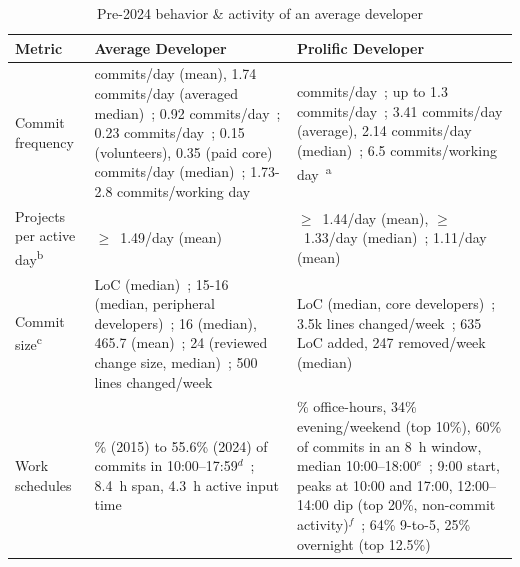 \documentclass[smallextended]{svjour3}
\begin{document}
\begin{table}[tbp]
\caption{Pre-2024 behavior \& activity of an average developer}
\label{tab:baseline}
\centering
\scriptsize
\setlength{\tabcolsep}{6pt}
\renewcommand{\arraystretch}{1.4}
\begin{tabularx}{\textwidth}{p{10.5em} >{\raggedright\arraybackslash}X >{\raggedright\arraybackslash}X}
\toprule
Metric & Average Developer & Prolific Developer \\
\midrule
Commit frequency & 0.312 commits/day (mean), 1.74 commits/day (averaged median)~\cite{kolassa2013empirical}; 0.92 commits/day~\cite{stray2026copilot}; 0.23 commits/day~\cite{milewicz2019characterizing}; 0.15 (volunteers), 0.35 (paid core) commits/day (median)~\cite{zhang2024how}; 1.73-2.8 commits/working day~\cite{gitclear2024git}& 4.01 commits/day~\cite{kolassa2013empirical}; up to 1.3 commits/day~\cite{zhang2024how}; 3.41 commits/day (average), 2.14 commits/day (median)~\cite{Vasilescu2016sky}; 6.5 commits/working day~\cite{gitclear2024git}\textsuperscript{a} \\
\midrule
Projects per active day\textsuperscript{b} & $\geq$~1.49/day (mean)~\cite{kohl2020multitasking} & $\geq$~1.44/day (mean), $\geq$~1.33/day (median)~\cite{Vasilescu2016sky}; 1.11/day (mean)~\cite{sarker2019developer} \\
\midrule
Commit size\textsuperscript{c} & 20 LoC (median)~\cite{riehle2012developer}; 15-16 (median, peripheral developers)~\cite{zhang2024how}; 16 (median), 465.7 (mean)~\cite{kolassa2013model}; 24 (reviewed change size, median)~\cite{sadowski2018modern}; 500 lines changed/week~\cite{zhang2024workrhythms} & 23 LoC (median, core developers)~\cite{zhang2024how}; 3.5k lines changed/week~\cite{zhang2024workrhythms}; 635 LoC added, 247 removed/week (median)~\cite{Vasilescu2016sky} \\
\midrule
Work schedules & 60.9\% (2015) to 55.6\% (2024) of commits in 10:00--17:59$^{d}$~\cite{Karyotakis2026}; 8.4~h span, 4.3~h active input time~\cite{meyer2017worklife} & 66\% office-hours, 34\% evening/weekend (top 10\%), 60\% of commits in an 8~h window, median 10:00--18:00$^{e}$~\cite{claes2018night}; 9:00 start, peaks at 10:00 and 17:00, 12:00--14:00 dip (top 20\%, non-commit activity)$^{f}$~\cite{xia2022exploring}; 64\% 9-to-5, 25\% overnight (top 12.5\%)~\cite{zhang2024workrhythms} \\
\bottomrule
\end{tabularx}


\end{table}
\end{document}
